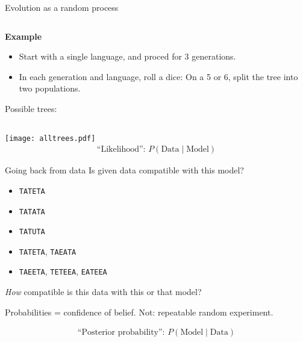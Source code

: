 \documentclass[9pt]{beamer}
\newcommand{\paragraph}[1]{\par{\bfseries #1}}
\begin{document}
\begin{frame}{Evolution as a random process}
\begin{columns}
\begin{column}{0.7\textwidth}
      \paragraph{Example}
      \begin{itemize}
      \item Start with a single language, and proced for 3 generations.
      \item In each generation and language, roll a dice: On a 5 or 6, split the tree into two populations.
      \end{itemize}
      \pause
      Possible trees:
    \end{column}
  \end{columns}
  \texttt{[image: alltrees.pdf]}
  \pause
  \begin{align}
    \text{“Likelihood”: }P(\text{Data} \mid \text{Model})
    \nonumber
  \end{align}
\end{frame}
\begin{frame}{Going back from data}
  Is given data compatible with this model?

  \pause
  \begin{itemize}
  \item \texttt{TATETA}
  \pause
  \item \texttt{TATATA}
  \pause
  \item \texttt{TATUTA}
  \pause
  \item \texttt{TATETA}, \texttt{TAEATA}
  \pause
  \item \texttt{TAEETA}, \texttt{TETEEA}, \texttt{EATEEA}
  \end{itemize}
  \pause

  \emph{How} compatible is this data with this or that model?

  Probabilities = confidence of belief. {\small Not: repeatable random
    experiment}.

  \begin{align}
    \text{“Posterior probability”: } P(\text{Model} \mid \text{Data})
    \nonumber
  \end{align}
\end{frame}
\end{document}
